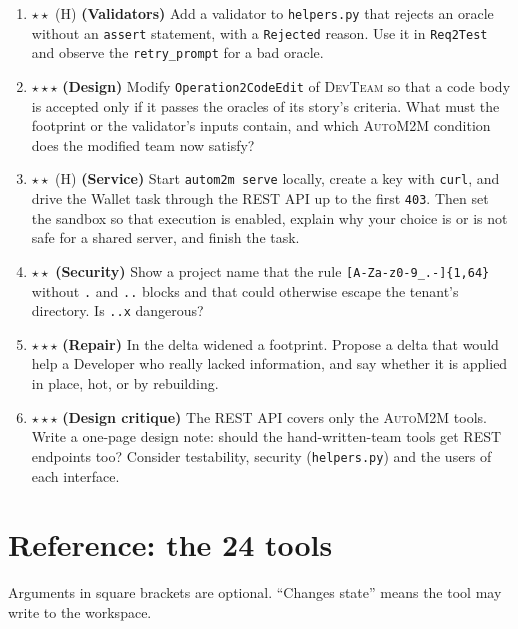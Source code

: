 \documentclass[10pt,a4paper]{article}
\newcommand{\auto}{\textsc{AutoM2M}}
\newcommand{\devteam}{\textsc{DevTeam}}
\newcommand{\code}[1]{\texttt{#1}}
\newcommand{\file}[1]{\texttt{#1}}
\begin{document}
\begin{enumerate}[leftmargin=1.6em, itemsep=4pt]
template with \code{AGENTHOT\_LLM=mock} and run it. Explain every
escalation from the template's comments and validators.
\item $\star\star$ (H) \textbf{(Validators)} Add a validator to
\file{helpers.py} that rejects an oracle without an \code{assert}
statement, with a \code{Rejected} reason. Use it in \code{Req2Test} and
observe the \code{retry\_prompt} for a bad oracle.
\item $\star\star\star$ \textbf{(Design)} Modify \code{Operation2CodeEdit} of
\devteam{} so that a code body is accepted only if it passes the oracles of
its story's criteria. What must the footprint or the validator's inputs
contain, and which \auto{} condition does the modified team now satisfy?
\item $\star\star$ (H) \textbf{(Service)} Start \code{autom2m serve}
locally, create a key with \code{curl}, and drive the Wallet task through the
REST API up to the first \code{403}. Then set the sandbox so that execution
is enabled, explain why your choice is or is not safe for a shared server,
and finish the task.
\item $\star\star$ \textbf{(Security)} Show a project name that the rule
\code{[A-Za-z0-9\_.-]\{1,64\}} without \code{.} and \code{..} blocks and that
could otherwise escape the tenant's directory. Is \code{..x} dangerous?
\item $\star\star\star$ \textbf{(Repair)} In  the delta
widened a footprint. Propose a delta that would help a Developer who really
lacked information, and say whether it is applied in place, hot, or by
rebuilding.
\item $\star\star\star$ \textbf{(Design critique)} The REST API covers only
the \auto{} tools. Write a one-page design note: should the hand-written-team
tools get REST endpoints too? Consider testability, security
(\file{helpers.py}) and the users of each interface.
\end{enumerate}

\appendix
\section{Reference: the 24 tools}\label{app:tools}

Arguments in square brackets are optional. ``Changes state'' means the tool
may write to the workspace.
\end{document}

